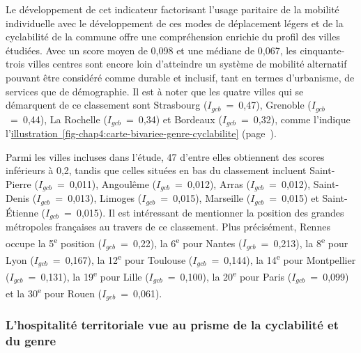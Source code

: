 \begin{refsegment}
Le développement de cet indicateur factorisant l'usage paritaire de la mobilité individuelle avec le développement de ces modes de déplacement légers et de la cyclabilité de la commune offre une compréhension enrichie du profil des villes étudiées. Avec un score moyen de 0,098 et une médiane de 0,067, les cinquante-trois villes centres sont encore loin d'atteindre un système de mobilité alternatif pouvant être considéré comme durable et inclusif, tant en termes d'urbanisme, de services que de démographie. Il est à noter que les quatre villes qui se démarquent de ce classement sont Strasbourg (\(I_{gcb}\)~=~0,47), Grenoble (\(I_{gcb}\)~=~0,44), La Rochelle (\(I_{gcb}\)~=~0,34) et Bordeaux (\(I_{gcb}\)~=~0,32), comme l'indique l'\hyperref[fig-chap4:carte-bivariee-genre-cyclabilite]{illustration~\ref{fig-chap4:carte-bivariee-genre-cyclabilite}} (page~\pageref{fig-chap4:carte-bivariee-genre-cyclabilite}).%

Parmi les villes incluses dans l'étude, 47 d'entre elles obtiennent des scores inférieurs à 0,2, tandis que celles situées en bas du classement incluent Saint-Pierre (\(I_{gcb}\)~=~0,011), Angoulême (\(I_{gcb}\)~=~0,012), Arras (\(I_{gcb}\)~=~0,012), Saint-Denis (\(I_{gcb}\)~=~0,013), Limoges (\(I_{gcb}\)~=~0,015), Marseille (\(I_{gcb}\)~=~0,015) et Saint-Étienne (\(I_{gcb}\)~=~0,015). Il est intéressant de mentionner la position des grandes métropoles françaises au travers de ce classement. Plus précisément, Rennes occupe la 5\textsuperscript{e} position (\(I_{gcb}\)~=~0,22), la 6\textsuperscript{e} pour Nantes (\(I_{gcb}\)~=~0,213), la 8\textsuperscript{e} pour Lyon (\(I_{gcb}\)~=~0,167), la 12\textsuperscript{e} pour Toulouse (\(I_{gcb}\)~=~0,144), la 14\textsuperscript{e} pour Montpellier (\(I_{gcb}\)~=~0,131), la 19\textsuperscript{e} pour Lille (\(I_{gcb}\)~=~0,100), la 20\textsuperscript{e} pour Paris (\(I_{gcb}\)~=~0,099) et la 30\textsuperscript{e} pour Rouen (\(I_{gcb}\)~=~0,061).%

\subsubsection*{L'hospitalité territoriale vue au prisme de la cyclabilité et du genre
    \label{chap4:discussion-cyclabilite-genre}
    }


\end{refsegment}
